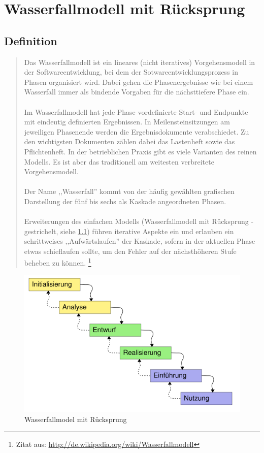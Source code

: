 \chapter{Wasserfallmodell mit Rücksprung}
\section{Definition}
\begin{quote}
Das Wasserfallmodell ist ein lineares (nicht iteratives) Vorgehensmodell in der Softwareentwicklung, bei dem der
 Sotwareentwicklungsprozess in Phasen organisiert wird. Dabei gehen die Phasenergebnisse wie bei einem Wasserfall immer
als bindende Vorgaben für die nächsttiefere Phase ein.\ \\ \\
Im Wasserfallmodell hat jede Phase vordefinierte Start- und Endpunkte mit eindeutig definierten Ergebnissen.
In Meilensteinsitzungen am jeweiligen Phasenende werden die Ergebnisdokumente verabschiedet. Zu den wichtigsten
Dokumenten zählen dabei das Lastenheft sowie das Pflichtenheft. In der betrieblichen Praxis gibt es viele Varianten
des reinen Modells. Es ist aber das traditionell am weitesten verbreitete Vorgehensmodell.\ \\ \\
Der Name ,,Wasserfall'' kommt von der häufig gewählten grafischen Darstellung der fünf bis sechs als Kaskade
angeordneten Phasen. \\ \\
Erweiterungen des einfachen Modells (Wasserfallmodell mit Rücksprung - gestrichelt, siehe \ref{w_model}) führen iterative Aspekte ein und erlauben
ein schrittweises ,,Aufwärtslaufen'' der Kaskade, sofern in der aktuellen Phase etwas schieflaufen sollte,
um den Fehler auf der nächsthöheren Stufe beheben zu können.
\footnote{Zitat aus: \url{http://de.wikipedia.org/wiki/Wasserfallmodell}}
\end{quote}
\begin{figure}[h]
\centering
\includegraphics[width=\textwidth]{./gfx/misc/567px-Wasserfallmodell.png}
\caption{Wasserfallmodel mit Rücksprung}
\label{w_model}
\end{figure}
\newpage


